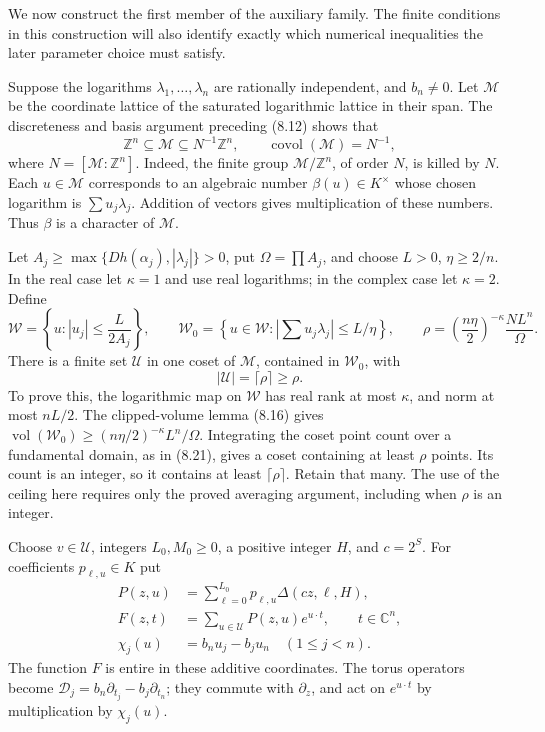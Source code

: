 \documentclass[
  11pt,
  a4paper,
]{article}
\begin{document}
We now construct the first member of the auxiliary family. The finite
conditions in this construction will also identify exactly which
numerical inequalities the later parameter choice must satisfy.

Suppose the logarithms \(\lambda_1,\ldots,\lambda_n\) are rationally
independent, and \(b_n\ne0\). Let \(\mathcal M\) be the coordinate
lattice of the saturated logarithmic lattice in their span. The
discreteness and basis argument preceding (8.12) shows that \[
\mathbb Z^n\subseteq\mathcal M\subseteq N^{-1}\mathbb Z^n,\qquad
\operatorname{covol}(\mathcal M)=N^{-1},
\] where \(N=[\mathcal M:\mathbb Z^n]\). Indeed, the finite group
\(\mathcal M/\mathbb Z^n\), of order \(N\), is killed by \(N\). Each
\(u\in\mathcal M\) corresponds to an algebraic number
\(\beta(u)\in K^\times\) whose chosen logarithm is
\(\sum u_j\lambda_j\). Addition of vectors gives multiplication of these
numbers. Thus \(\beta\) is a character of \(\mathcal M\).

Let \(A_j\ge\max\{Dh(\alpha_j),|\lambda_j|\}>0\), put
\(\Omega=\prod A_j\), and choose \(L>0\), \(\eta\ge2/n\). In the real
case let \(\kappa=1\) and use real logarithms; in the complex case let
\(\kappa=2\). Define \[
\mathcal W=\left\{u:|u_j|\le\frac L{2A_j}\right\},\qquad
\mathcal W_0=\left\{u\in\mathcal W:
\left|\sum u_j\lambda_j\right|\le L/\eta\right\},\qquad
\rho=\left(\frac{n\eta}2\right)^{-\kappa}\frac{NL^n}{\Omega}.
\] There is a finite set \(\mathcal U\) in one coset of \(\mathcal M\),
contained in \(\mathcal W_0\), with \[
|\mathcal U|=\lceil\rho\rceil\ge\rho.
\tag{8.96}
\] To prove this, the logarithmic map on \(\mathcal W\) has real rank at
most \(\kappa\), and norm at most \(nL/2\). The clipped-volume lemma
(8.16) gives \(\operatorname{vol}(\mathcal W_0)\ge
(n\eta/2)^{-\kappa}L^n/\Omega\). Integrating the coset point count over
a fundamental domain, as in (8.21), gives a coset containing at least
\(\rho\) points. Its count is an integer, so it contains at least
\(\lceil\rho\rceil\). Retain that many. The use of the ceiling here
requires only the proved averaging argument, including when \(\rho\) is
an integer.

Choose \(v\in\mathcal U\), integers \(L_0,M_0\ge0\), a positive integer
\(H\), and \(c=2^S\). For coefficients \(p_{\ell,u}\in K\) put \[
\begin{aligned}
P(z,u)&=\sum_{\ell=0}^{L_0}p_{\ell,u}\Delta(cz,\ell,H),\\
F(z,t)&=\sum_{u\in\mathcal U}P(z,u)e^{u\cdot t},
\qquad t\in\mathbb C^n,\\
\chi_j(u)&=b_nu_j-b_ju_n\quad(1\le j<n).
\end{aligned}
\tag{8.97}
\] The function \(F\) is entire in these additive coordinates. The torus
operators become \(\mathcal D_j=b_n\partial_{t_j}-b_j\partial_{t_n}\);
they commute with \(\partial_z\), and act on \(e^{u\cdot t}\) by
multiplication by \(\chi_j(u)\).
\end{document}

